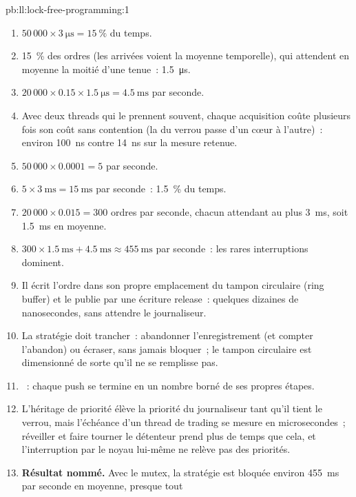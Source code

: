 \begin{solution}{pb:ll:lock-free-programming:1}
\begin{enumerate}
\item $50\,000 \times \qty{3}{\micro\second} = 15~\%$ du temps.
\item 15~\% des ordres (les arrivées voient la moyenne temporelle), qui attendent en moyenne la moitié d'une tenue~: \qty{1.5}{\micro\second}.
\item $20\,000 \times 0.15 \times \qty{1.5}{\micro\second} = \qty{4.5}{\milli\second}$ par seconde.
\item Avec deux threads qui le prennent souvent, chaque acquisition coûte plusieurs fois son coût sans contention (la  du verrou passe
d'un cœur à l'autre)~: environ \qty{100}{\nano\second} contre \qty{14}{\nano\second} sur la mesure retenue.
\item $50\,000 \times 0.0001 = 5$ par seconde.
\item $5 \times \qty{3}{\milli\second} = \qty{15}{\milli\second}$ par seconde~: 1.5~\% du temps.
\item $20\,000 \times 0.015 = 300$ ordres par seconde, chacun attendant au plus \qty{3}{\milli\second}, soit \qty{1.5}{\milli\second} en
moyenne.
\item $300 \times \qty{1.5}{\milli\second} + \qty{4.5}{\milli\second} \approx \qty{455}{\milli\second}$ par seconde~: les rares
interruptions dominent.
\item Il écrit l'ordre dans son propre emplacement du tampon circulaire (ring buffer) et le publie par une écriture release~: quelques dizaines de nanosecondes, sans
attendre le journaliseur.
\item La stratégie doit trancher~: abandonner l'enregistrement (et compter l'abandon) ou écraser, sans jamais bloquer~; le tampon circulaire est dimensionné de sorte qu'il
ne se remplisse pas.
\item {}~: chaque push se termine en un nombre borné de ses propres étapes.
\item L'héritage de priorité élève la priorité du journaliseur tant qu'il tient le verrou, mais l'échéance d'un thread de trading se mesure en microsecondes~;
réveiller et faire tourner le détenteur prend plus de temps que cela, et l'interruption par le noyau lui-même ne relève pas des priorités.
\item \textbf{Résultat nommé.} Avec le mutex, la stratégie est bloquée environ \qty{455}{\milli\second} par seconde en moyenne, presque tout

\end{enumerate}
\end{solution}
